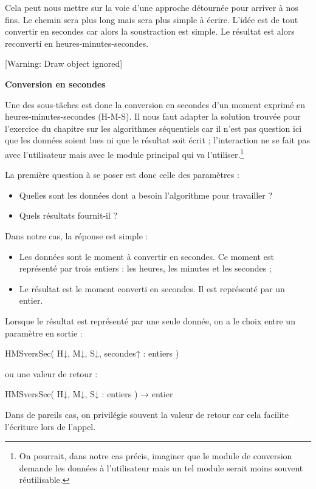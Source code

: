 {
Cela peut nous mettre sur la voie d'une approche
détournée pour arriver à nos fins. Le chemin sera plus long mais sera
plus simple à écrire. L'idée est de tout convertir en
secondes car alors la soustraction est simple. Le résultat est alors
reconverti en heures-minutes-secondes. }

[Warning: Draw object ignored]

{\sffamily\bfseries
Conversion en secondes}

{
Une des sous-tâches est donc la conversion en secondes
d'un moment exprimé en heures-minutes-secondes
(H-M-S). Il nous faut adapter la solution trouvée pour
l'exercice du chapitre sur les algorithmes séquentiels
car il n'est pas question ici que les données soient
lues ni que le résultat soit écrit ; l'interaction ne
se fait pas avec l'utilisateur mais avec le module
principal qui va l'utiliser.\footnote{On pourrait,
dans notre cas précis, imaginer que le module de conversion demande les
données à l'utilisateur mais un tel module serait
moins souvent réutilisable.}}

{
La première question à se poser est donc celle des paramètres :}

\liststyleListv
\begin{itemize}
\item {
Quelles sont les données dont a besoin l'algorithme
pour travailler ?}
\item {
Quels résultats fournit-il ?}
\end{itemize}
{
Dans notre cas, la réponse est simple :}

\liststyleListv
\begin{itemize}
\item {
Les données sont le moment à convertir en secondes. Ce moment est
représenté par trois entiers : les heures, les minutes et les secondes
;}
\item {
Le résultat est le moment converti en secondes. Il est représenté par un
entier.}
\end{itemize}
{
Lorsque le résultat est représenté par une seule donnée, on a le choix
entre un paramètre en sortie :}

{\sffamily
{} HMSversSec( H{↓},
M{↓}, S{↓},
secondes{↑ :} entiers )}

{
ou une valeur de retour :}

{\sffamily
{} HMSversSec( H{↓},
M{↓}, S{↓ :} entiers )
{→}{ entier}}

{
Dans de pareils cas, on privilégie souvent la valeur de retour car cela
facilite l'écriture lors de l'appel.
}

